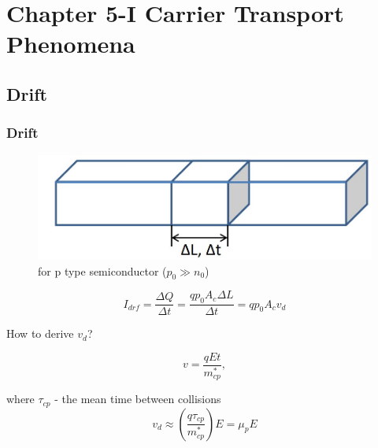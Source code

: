 \documentclass{beamer}
\begin{document}
\section{Chapter 5-I Carrier Transport Phenomena}
\subsection{Drift}
    \begin{frame} \frametitle{Drift}
        \begin{figure}[H]
            \centering
            \includegraphics[width=0.6\linewidth]{Drift.jpg}
            \caption{for p type semiconductor ($p_0 \gg n_0$)}
            \label{fig:Drift.jpg}
        \end{figure}
        
        \begin{equation*}
            I_{drf} = \frac{\Delta Q}{\Delta t} = \frac{qp_0 A_c \Delta L}{\Delta t} = qp_0 A_c v_d 
        \end{equation*}

        How to derive $v_d$?

        \begin{equation*}
            v = \frac{qEt}{m^*_{cp}} ,
        \end{equation*}
        \par where $\tau_{cp}$ - the mean time between collisions
        \begin{equation*}
            v_d \approx \left( \frac{q \tau_{cp}}{m^*_{cp}}  \right) E = \mu_p E
        \end{equation*}
    \end{frame}
\end{document}

